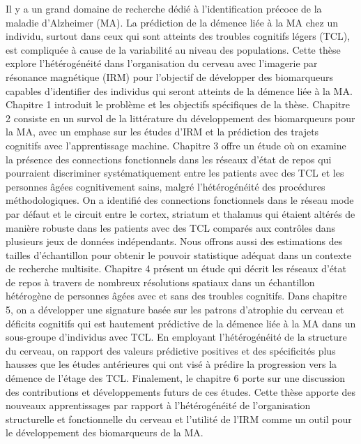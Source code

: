 \documentclass[
12pt, %
oneside, %
english, %
onehalfspacing, %
liststotoc, %
toctotoc, %
headsepline, %
consistentlayout, %
]{McGillThesis} %
\begin{document}
\begin{resume}
\addchaptertocentry{\resumename} %
Il y a un grand domaine de recherche dédié à l’identification précoce de la maladie d’Alzheimer (MA). La prédiction de la démence liée à la MA chez un individu, surtout dans ceux qui sont atteints des troubles cognitifs légers (TCL), est compliquée à cause de la variabilité au niveau des populations. Cette thèse explore l’hétérogénéité dans l’organisation du cerveau avec l’imagerie par résonance magnétique (IRM) pour l’objectif de développer des biomarqueurs capables d’identifier des individus qui seront atteints de la démence liée à la MA. Chapitre 1 introduit le problème et les objectifs spécifiques de la thèse. Chapitre 2 consiste en un survol de la littérature du développement des biomarqueurs pour la MA, avec un emphase sur les études d'IRM et la prédiction des trajets cognitifs avec l’apprentissage machine. Chapitre 3 offre un étude où on examine la présence des connections fonctionnels dans les réseaux d’état de repos qui pourraient discriminer systématiquement entre les patients avec des TCL et les personnes âgées cognitivement sains, malgré l’hétérogénéité des procédures méthodologiques. On a identifié des connections fonctionnels dans le réseau mode par défaut et le circuit entre le cortex, striatum et thalamus qui étaient altérés de manière robuste dans les patients avec des TCL comparés aux contrôles dans plusieurs jeux de données indépendants. Nous offrons aussi des estimations des tailles d’échantillon pour obtenir le pouvoir statistique adéquat dans un contexte de recherche multisite. Chapitre 4 présent un étude qui décrit les réseaux d’état de repos à travers de nombreux résolutions spatiaux dans un échantillon hétérogène de personnes âgées avec et sans des troubles cognitifs. Dans chapitre 5, on a développer une signature basée sur les patrons d’atrophie du cerveau et déficits cognitifs qui est hautement prédictive de la démence liée à la MA dans un sous-groupe d’individus avec TCL. En employant l’hétérogénéité de la structure du cerveau, on rapport des valeurs prédictive positives et des spécificités plus hausses que les études antérieures qui ont visé à prédire la progression vers la démence de l’étage des TCL. Finalement, le chapitre 6 porte sur une discussion des contributions et développements futurs de ces études. Cette thèse apporte des nouveaux apprentissages par rapport à l’hétérogénéité de l’organisation structurelle et fonctionnelle du cerveau et l’utilité de l’IRM comme un outil pour le développement des biomarqueurs de la MA.
\end{resume}
\end{document}
